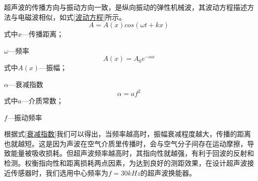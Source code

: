       超声波的传播方向与振动方向一致，是纵向振动的弹性机械波，其波动方程描述方法与电磁波相似，如式\ref{波动方程}所示。
    \begin{equation}
    	A=A(x)cos(\omega t+kx)
    	\label{波动方程}
    \end{equation}
	式中\quad$x$---传播距离；\par
	\quad$\omega$---频率
	\begin{equation}
		A(x)=A_0 e^{-\alpha x}
		\label{振幅方程}
	\end{equation}
	式中\quad$A(x)$---振幅；\par
		\quad$\alpha$---衰减指数
	\begin{equation}
		\alpha=a f^2
		\label{衰减指数}
	\end{equation}
	式中\quad $a$---介质常数；\par
	   \quad $f$---振动频率\par
    根据式\ref{衰减指数}我们可以得出，当频率越高时，振幅衰减程度越大，传播的距离也就越短。这是因为声波在空气介质里传播时，会与空气分子间存在运动摩擦，导致能量被吸收损耗。但超声波频率越高时，其指向性就越强，有利于回波的反射和检测。权衡指向性和距离损耗两点因素，为达到良好的测距效果，在设计超声波接近传感器时，我们选用中心频率为$f=30kHz$的超声波换能器。
